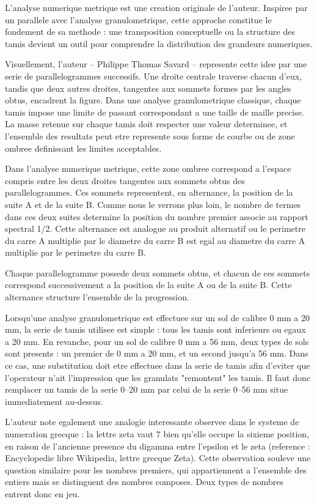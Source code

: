 \documentclass[a4paper,11pt]{article}
\newenvironment{resume}{%
    \begin{tcolorbox}[colback=purple!5,colframe=holpurple,title={\textbf{Résumé visuel}}]
}{%
    \end{tcolorbox}
}
\begin{document}
\begin{resume}
L'analyse numerique metrique est une creation originale de l'auteur. Inspiree par un parallele avec l'analyse granulometrique, cette approche constitue le fondement de sa methode : une transposition conceptuelle ou la structure des tamis devient un outil pour comprendre la distribution des grandeurs numeriques.

Visuellement, l'auteur -- Philippe Thomas Savard -- represente cette idee par une serie de parallelogrammes successifs. Une droite centrale traverse chacun d'eux, tandis que deux autres droites, tangentes aux sommets formes par les angles obtus, encadrent la figure. Dans une analyse granulometrique classique, chaque tamis impose une limite de passant correspondant a une taille de maille precise. La masse retenue sur chaque tamis doit respecter une valeur determinee, et l'ensemble des resultats peut etre represente sous forme de courbe ou de zone ombree definissant les limites acceptables.

Dans l'analyse numerique metrique, cette zone ombree correspond a l'espace compris entre les deux droites tangentes aux sommets obtus des parallelogrammes. Ces sommets representent, en alternance, la position de la suite A et de la suite B. Comme nous le verrons plus loin, le nombre de termes dans ces deux suites determine la position du nombre premier associe au rapport spectral 1/2. Cette alternance est analogue au produit alternatif ou le perimetre du carre A multiplie par le diametre du carre B est egal au diametre du carre A multiplie par le perimetre du carre B.

Chaque parallelogramme possede deux sommets obtus, et chacun de ces sommets correspond successivement a la position de la suite A ou de la suite B. Cette alternance structure l'ensemble de la progression.

Lorsqu'une analyse granulometrique est effectuee sur un sol de calibre 0 mm a 20 mm, la serie de tamis utilisee est simple : tous les tamis sont inferieurs ou egaux a 20 mm. En revanche, pour un sol de calibre 0 mm a 56 mm, deux types de sols sont presents : un premier de 0 mm a 20 mm, et un second jusqu'a 56 mm. Dans ce cas, une substitution doit etre effectuee dans la serie de tamis afin d'eviter que l'operateur n'ait l'impression que les granulats "remontent" les tamis. Il faut donc remplacer un tamis de la serie 0--20 mm par celui de la serie 0--56 mm situe immediatement au-dessus.

L'auteur note egalement une analogie interessante observee dans le systeme de numeration grecque : la lettre zeta vaut 7 bien qu'elle occupe la sixieme position, en raison de l'ancienne presence du digamma entre l'epsilon et le zeta (reference : Encyclopedie libre Wikipedia, lettre grecque Zeta). Cette observation souleve une question similaire pour les nombres premiers, qui appartiennent a l'ensemble des entiers mais se distinguent des nombres composes. Deux types de nombres entrent donc en jeu.


\end{resume}
\end{document}
